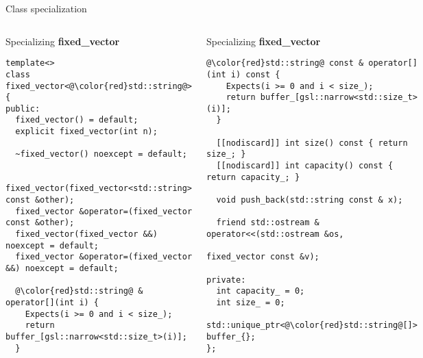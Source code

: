 \begin{frame}[t,fragile,shrink=20]{Class specialization}
\begin{columns}[T]

\begin{block}{Specializing \textbf{fixed\_vector}}
\begin{lstlisting}[escapechar=@]
template<>
class fixed_vector<@\color{red}std::string@> {
public:
  fixed_vector() = default;
  explicit fixed_vector(int n);

  ~fixed_vector() noexcept = default;

  fixed_vector(fixed_vector<std::string> const &other);
  fixed_vector &operator=(fixed_vector const &other);
  fixed_vector(fixed_vector &&) noexcept = default;
  fixed_vector &operator=(fixed_vector &&) noexcept = default;

  @\color{red}std::string@ & operator[](int i) {
    Expects(i >= 0 and i < size_);
    return buffer_[gsl::narrow<std::size_t>(i)];
  }

\end{lstlisting}
\end{block}

\begin{block}{Specializing \textbf{fixed\_vector}}
\begin{lstlisting}[escapechar=@]
  @\color{red}std::string@ const & operator[](int i) const {
    Expects(i >= 0 and i < size_);
    return buffer_[gsl::narrow<std::size_t>(i)];
  }

  [[nodiscard]] int size() const { return size_; }
  [[nodiscard]] int capacity() const { return capacity_; }

  void push_back(std::string const & x);

  friend std::ostream & operator<<(std::ostream &os, 
                                   fixed_vector const &v);

private:
  int capacity_ = 0;
  int size_ = 0;
  std::unique_ptr<@\color{red}std::string@[]> buffer_{};
};
\end{lstlisting}
\end{block}

\end{columns}
\end{frame}

